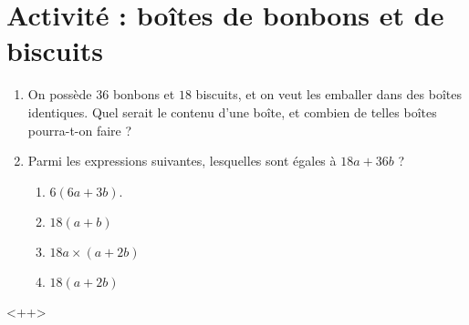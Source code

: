
\section{Activité : boîtes de bonbons et de biscuits}

\begin{enumerate}
    \item
        
On possède \( 36\) bonbons et \( 18\) biscuits, et on veut les emballer dans des boîtes identiques. Quel serait le contenu d'une boîte, et combien de telles boîtes pourra-t-on faire ?

\item
    Parmi les expressions suivantes, lesquelles sont égales à \( 18a+36b\) ?
    \begin{enumerate}
        \item
            \( 6(6a+3b)\).
        \item
            \( 18(a+b)\)
        \item
            \( 18a\times (a+2b)\)
        \item
            \( 18(a+2b)\)
    \end{enumerate}

\end{enumerate}

<++>

